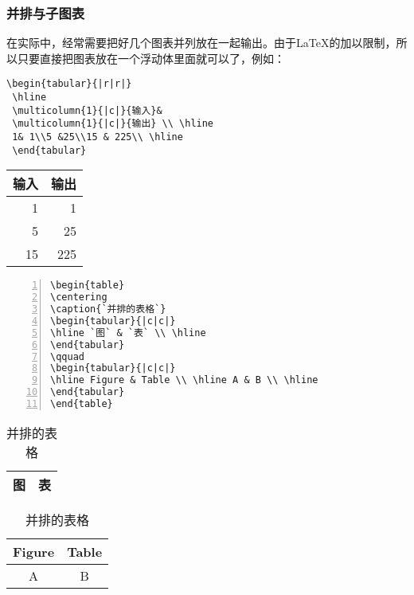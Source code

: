 \subsubsection{并排与子图表}
在实际中，经常需要把好几个图表并列放在一起输出。由于\LaTeX 的加以限制，所以只要直接把图表放在一个浮动体里面就可以了，例如：
\begin{table}[ht]
\begin{minipage}{0.7\linewidth}
\begin{lstlisting}
\begin{tabular}{|r|r|}
 \hline
 \multicolumn{1}{|c|}{输入}&
 \multicolumn{1}{|c|}{输出} \\ \hline
 1& 1\\5 &25\\15 & 225\\ \hline
 \end{tabular}
\end{lstlisting}
\end{minipage}
	\quad
	\begin{tabular}{|r|r|}
		\hline
		\multicolumn{1}{|c|}{输入}&
		\multicolumn{1}{|c|}{输出} \\ \hline
		1& 1\\5 &25\\
		15 & 225\\ \hline
	\end{tabular}

\end{table}

\begin{lstlisting}[numbers=left]  
\begin{table}
\centering
\caption{`并排的表格`}
\begin{tabular}{|c|c|}
\hline `图` & `表` \\ \hline 
\end{tabular} 
\qquad
\begin{tabular}{|c|c|}
\hline Figure & Table \\ \hline A & B \\ \hline
\end{tabular}
\end{table}
\end{lstlisting}               %

\begin{table}[ht]
	\centering
	\caption{并排的表格}
	\begin{tabular}{|c|c|}
		\hline 图 & 表 \\ \hline 
	\end{tabular}
	\qquad
	\begin{tabular}{|c|c|}
		\hline Figure & Table \\ \hline A & B \\ \hline
	\end{tabular}
\end{table}

